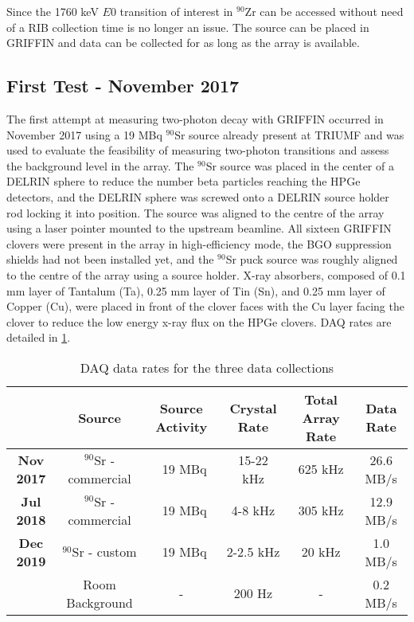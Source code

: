 \documentclass[cnatzke_thesis_proposal.tex]{subfiles}
\begin{document}
Since the 1760 keV $E0$ transition of interest in $^{90}$Zr can be accessed without need of a RIB collection time is no longer an issue.
The source can be placed in GRIFFIN and data can be collected for as long as the array is available. 

\subsection{First Test - November 2017}
The first attempt at measuring two-photon decay with GRIFFIN occurred in November 2017 using a 19 MBq $^{90}$Sr source already present at TRIUMF and was used to evaluate the feasibility of measuring two-photon transitions and assess the background level in the array.
The $^{90}$Sr source was placed in the center of a DELRIN sphere to reduce the number beta particles reaching the HPGe detectors, and the DELRIN sphere was screwed onto a DELRIN source holder rod locking it into position.
The source was aligned to the centre of the array using a laser pointer mounted to the upstream beamline.
All sixteen GRIFFIN clovers were present in the array in high-efficiency mode, the BGO suppression shields had not been installed yet, and the $^{90}$Sr puck source was roughly aligned to the centre of the array using a source holder.
X-ray absorbers, composed of 0.1 mm layer of Tantalum (Ta), 0.25 mm layer of Tin (Sn), and 0.25 mm layer of Copper (Cu), were placed in front of the clover faces with the Cu layer facing the clover to reduce the low energy x-ray flux on the HPGe clovers.
DAQ rates are detailed in \ref{tab:daq_rates}.

\begin{table}[]
  \centering
  \begin{tabular}{cccccc}
                    & Source                  & Source Activity & Crystal Rate & Total Array Rate & Data Rate \\ \hline
  \textbf{Nov 2017} & $^{90}$Sr - commercial  & ~19 MBq         & 15-22 kHz    & 625 kHz          & 26.6 MB/s \\ \hline
  \textbf{Jul 2018} & $^{90}$Sr - commercial  & ~19 MBq         & 4-8 kHz      & 305 kHz          & 12.9 MB/s \\ \hline
  \textbf{Dec 2019} & $^{90}$Sr - custom      & ~19 MBq         & 2-2.5 kHz    & 20 kHz           & 1.0 MB/s  \\
                    & Room Background         & -               & 200 Hz       & -                & 0.2 MB/s  \\ \hline
  \end{tabular}
  \caption{DAQ data rates for the three data collections}
  \label{tab:daq_rates}
\end{table}
\end{document}
